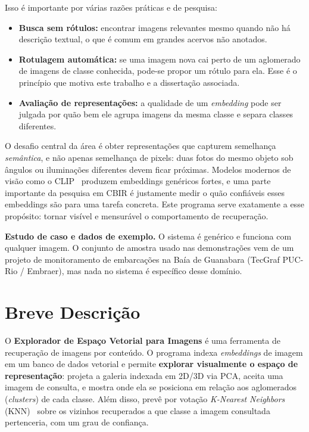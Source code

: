 \documentclass[10pt]{article}
\begin{document}
Isso é importante por várias razões práticas e de pesquisa:

\begin{itemize}
  \item \textbf{Busca sem rótulos:} encontrar imagens relevantes mesmo quando
  não há descrição textual, o que é comum em grandes acervos não anotados.
  \item \textbf{Rotulagem automática:} se uma imagem nova cai perto de um
  aglomerado de imagens de classe conhecida, pode-se propor um rótulo para ela.
  Esse é o princípio que motiva este trabalho e a dissertação associada.
  \item \textbf{Avaliação de representações:} a qualidade de um \emph{embedding}
  pode ser julgada por quão bem ele agrupa imagens da mesma classe e separa
  classes diferentes.
\end{itemize}

O desafio central da área é obter representações que capturem semelhança
\emph{semântica}, e não apenas semelhança de pixels: duas fotos do mesmo objeto
sob ângulos ou iluminações diferentes devem ficar próximas. Modelos modernos de
visão como o CLIP~\cite{radford2021clip} produzem embeddings genéricos fortes, e
uma parte importante da pesquisa em CBIR é justamente medir o quão confiáveis
esses embeddings são para uma tarefa concreta. Este programa serve exatamente a
esse propósito: tornar visível e mensurável o comportamento de recuperação.

\medskip
\noindent\textbf{Estudo de caso e dados de exemplo.} O sistema é genérico e
funciona com qualquer imagem. O conjunto de amostra usado nas demonstrações vem
de um projeto de monitoramento de embarcações na Baía de Guanabara (TecGraf
PUC-Rio / Embraer), mas nada no sistema é específico desse domínio.

\section{Breve Descrição}

O \textbf{Explorador de Espaço Vetorial para Imagens} é uma ferramenta de
recuperação de imagens por conteúdo. O programa indexa \emph{embeddings} de
imagem em um banco de dados vetorial e permite \textbf{explorar visualmente o
espaço de representação}: projeta a galeria indexada em 2D/3D via PCA, aceita
uma imagem de consulta, e mostra onde ela se posiciona em relação aos
aglomerados (\emph{clusters}) de cada classe. Além disso, prevê por votação
\emph{K-Nearest Neighbors} (KNN)~\cite{cover1967knn} sobre os vizinhos
recuperados a que classe a imagem consultada pertenceria, com um grau de
confiança.
\end{document}
